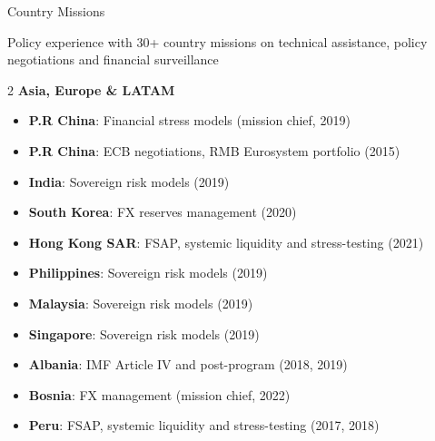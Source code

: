 \documentclass[usegeometry, 10pt, a4paper]{cv} %
\begin{document}
\begin{rubriquetableau}[0.95\textwidth]{Country Missions}

Policy experience with 30+ country missions on technical assistance, policy negotiations and financial surveillance\\

\begin{multicols}{2}
  \textbf{\large Asia, Europe \& LATAM}
\begin{itemize}
  \item \textbf{P.R China}: Financial stress models (mission chief, 2019) 
  \item \textbf{P.R China}: ECB negotiations, RMB Eurosystem portfolio (2015)
  \item \textbf{India}: Sovereign risk models (2019)
  \item \textbf{South Korea}: FX reserves management (2020)
  \item \textbf{Hong Kong SAR}: FSAP, systemic liquidity and stress-testing (2021)
  \item \textbf{Philippines}: Sovereign risk models (2019)
  \item \textbf{Malaysia}: Sovereign risk models (2019)
  \item \textbf{Singapore}: Sovereign risk models (2019)
  \item \textbf{Albania}: IMF Article IV and post-program (2018, 2019)
  \item \textbf{Bosnia}: FX management (mission chief, 2022)
  \item \textbf{Peru}: FSAP, systemic liquidity and stress-testing (2017, 2018)
\end{itemize}


\end{multicols}
\end{rubriquetableau}
\end{document}
